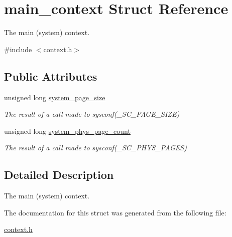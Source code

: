 \hypertarget{structmain__context}{}\section{main\+\_\+context Struct Reference}
\label{structmain__context}


The main (system) context.  




{\ttfamily \#include $<$context.\+h$>$}

\subsection*{Public Attributes}
\begin{DoxyCompactItemize}
\item 
\mbox{\label{structmain__context_a1ab3cd13dba2f0d8ec3fec11c9f967cd}} 
unsigned long \mbox{\hyperlink{structmain__context_a1ab3cd13dba2f0d8ec3fec11c9f967cd}{system\+\_\+page\+\_\+size}}
\begin{DoxyCompactList}\small\item\em The result of a call made to sysconf(\+\_\+\+S\+C\+\_\+\+P\+A\+G\+E\+\_\+\+S\+I\+Z\+E) \end{DoxyCompactList}\item 
\mbox{\label{structmain__context_a0f2e31150485bdc8fed9bf311c82bc73}} 
unsigned long \mbox{\hyperlink{structmain__context_a0f2e31150485bdc8fed9bf311c82bc73}{system\+\_\+phys\+\_\+page\+\_\+count}}
\begin{DoxyCompactList}\small\item\em The result of a call made to sysconf(\+\_\+\+S\+C\+\_\+\+P\+H\+Y\+S\+\_\+\+P\+A\+G\+E\+S) \end{DoxyCompactList}\end{DoxyCompactItemize}


\subsection{Detailed Description}
The main (system) context. 

The documentation for this struct was generated from the following file\+:\begin{DoxyCompactItemize}
\item 
\mbox{\hyperlink{context_8h}{context.\+h}}\end{DoxyCompactItemize}
